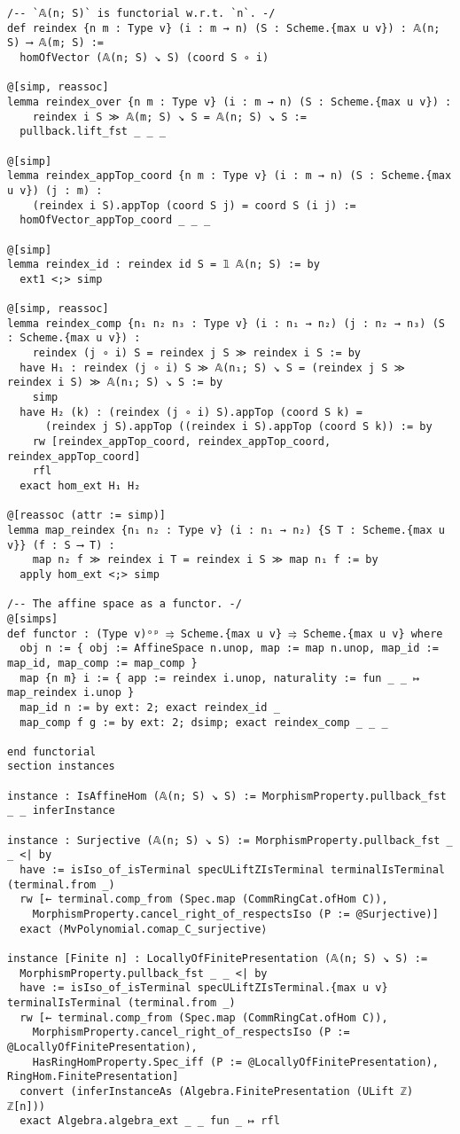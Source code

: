 \documentclass{article}
\begin{document}
\begin{lstlisting}[language=Lean, caption={AffineSpace.lean}]
/-- `𝔸(n; S)` is functorial w.r.t. `n`. -/
def reindex {n m : Type v} (i : m → n) (S : Scheme.{max u v}) : 𝔸(n; S) ⟶ 𝔸(m; S) :=
  homOfVector (𝔸(n; S) ↘ S) (coord S ∘ i)

@[simp, reassoc]
lemma reindex_over {n m : Type v} (i : m → n) (S : Scheme.{max u v}) :
    reindex i S ≫ 𝔸(m; S) ↘ S = 𝔸(n; S) ↘ S :=
  pullback.lift_fst _ _ _

@[simp]
lemma reindex_appTop_coord {n m : Type v} (i : m → n) (S : Scheme.{max u v}) (j : m) :
    (reindex i S).appTop (coord S j) = coord S (i j) :=
  homOfVector_appTop_coord _ _ _

@[simp]
lemma reindex_id : reindex id S = 𝟙 𝔸(n; S) := by
  ext1 <;> simp

@[simp, reassoc]
lemma reindex_comp {n₁ n₂ n₃ : Type v} (i : n₁ → n₂) (j : n₂ → n₃) (S : Scheme.{max u v}) :
    reindex (j ∘ i) S = reindex j S ≫ reindex i S := by
  have H₁ : reindex (j ∘ i) S ≫ 𝔸(n₁; S) ↘ S = (reindex j S ≫ reindex i S) ≫ 𝔸(n₁; S) ↘ S := by
    simp
  have H₂ (k) : (reindex (j ∘ i) S).appTop (coord S k) =
      (reindex j S).appTop ((reindex i S).appTop (coord S k)) := by
    rw [reindex_appTop_coord, reindex_appTop_coord, reindex_appTop_coord]
    rfl
  exact hom_ext H₁ H₂

@[reassoc (attr := simp)]
lemma map_reindex {n₁ n₂ : Type v} (i : n₁ → n₂) {S T : Scheme.{max u v}} (f : S ⟶ T) :
    map n₂ f ≫ reindex i T = reindex i S ≫ map n₁ f := by
  apply hom_ext <;> simp

/-- The affine space as a functor. -/
@[simps]
def functor : (Type v)ᵒᵖ ⥤ Scheme.{max u v} ⥤ Scheme.{max u v} where
  obj n := { obj := AffineSpace n.unop, map := map n.unop, map_id := map_id, map_comp := map_comp }
  map {n m} i := { app := reindex i.unop, naturality := fun _ _ ↦ map_reindex i.unop }
  map_id n := by ext: 2; exact reindex_id _
  map_comp f g := by ext: 2; dsimp; exact reindex_comp _ _ _

end functorial
section instances

instance : IsAffineHom (𝔸(n; S) ↘ S) := MorphismProperty.pullback_fst _ _ inferInstance

instance : Surjective (𝔸(n; S) ↘ S) := MorphismProperty.pullback_fst _ _ <| by
  have := isIso_of_isTerminal specULiftZIsTerminal terminalIsTerminal (terminal.from _)
  rw [← terminal.comp_from (Spec.map (CommRingCat.ofHom C)),
    MorphismProperty.cancel_right_of_respectsIso (P := @Surjective)]
  exact ⟨MvPolynomial.comap_C_surjective⟩

instance [Finite n] : LocallyOfFinitePresentation (𝔸(n; S) ↘ S) :=
  MorphismProperty.pullback_fst _ _ <| by
  have := isIso_of_isTerminal specULiftZIsTerminal.{max u v} terminalIsTerminal (terminal.from _)
  rw [← terminal.comp_from (Spec.map (CommRingCat.ofHom C)),
    MorphismProperty.cancel_right_of_respectsIso (P := @LocallyOfFinitePresentation),
    HasRingHomProperty.Spec_iff (P := @LocallyOfFinitePresentation), RingHom.FinitePresentation]
  convert (inferInstanceAs (Algebra.FinitePresentation (ULift ℤ) ℤ[n]))
  exact Algebra.algebra_ext _ _ fun _ ↦ rfl


\end{lstlisting}
\end{document}
